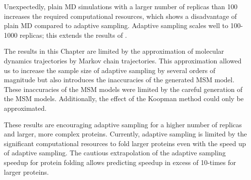 Unexpectedly, plain MD simulations with a larger number of replicas than 100 increases the required computational resources, which shows a disadvantage of plain MD compared to adaptive sampling. Adaptive sampling scales well to 100-1000 replicas; this extends the results of \cite{bowman2010enhanced}.  

The results in this Chapter are limited by the approximation of molecular dynamics trajectories by Markov chain trajectories. This approximation allowed us to increase the sample size of adaptive sampling by several orders of magnitude but also introduces the inaccuracies of the generated MSM model. These inaccuracies of the MSM models were limited by the careful generation of the MSM models. Additionally, the effect of the Koopman method could only be approximated.

These results are encouraging adaptive sampling for a higher number of replicas and larger, more complex proteins. Currently, adaptive sampling is limited by the significant computational resources to fold larger proteins even with the speed up of adaptive sampling. The cautious extrapolation of the adaptive sampling speedup for protein folding allows predicting speedup in excess of 10-times for larger proteins.











